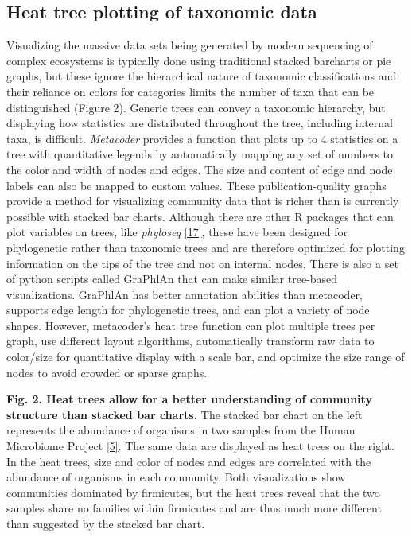 \documentclass[10pt,letterpaper]{article}
\begin{document}
\subsection*{Heat tree plotting of taxonomic
data}\label{heat-tree-plotting-of-taxonomic-data}

Visualizing the massive data sets being generated by modern sequencing
of complex ecosystems is typically done using traditional stacked
barcharts or pie graphs, but these ignore the hierarchical nature of
taxonomic classifications and their reliance on colors for categories
limits the number of taxa that can be distinguished (Figure 2). Generic
trees can convey a taxonomic hierarchy, but displaying how statistics
are distributed throughout the tree, including internal taxa, is
difficult. \emph{Metacoder} provides a function that plots up to 4
statistics on a tree with quantitative legends by automatically mapping
any set of numbers to the color and width of nodes and edges. The size
and content of edge and node labels can also be mapped to custom values.
These publication-quality graphs provide a method for visualizing
community data that is richer than is currently possible with stacked
bar charts. Although there are other R packages that can plot variables
on trees, like \emph{phyloseq} \hyperref[csl:17]{[17]}, these have
been designed for phylogenetic rather than taxonomic trees and are
therefore optimized for plotting information on the tips of the tree and
not on internal nodes. There is also a set of python scripts called
GraPhlAn that can make similar tree-based visualizations. GraPhlAn has
better annotation abilities than metacoder, supports edge length for
phylogenetic trees, and can plot a variety of node shapes. However,
metacoder's heat tree function can plot multiple trees per graph, use
different layout algorithms, automatically transform raw data to
color/size for quantitative display with a scale bar, and optimize the
size range of nodes to avoid crowded or sparse graphs.

\textbf{Fig. 2. Heat trees allow for a better understanding of community
structure than stacked bar charts.} The stacked bar chart on the left
represents the abundance of organisms in two samples from the Human
Microbiome Project \hyperref[csl:5]{[5]}. The same data are
displayed as heat trees on the right. In the heat trees, size and color
of nodes and edges are correlated with the abundance of organisms in
each community. Both visualizations show communities dominated by
firmicutes, but the heat trees reveal that the two samples share no
families within firmicutes and are thus much more different than
suggested by the stacked bar chart.
\end{document}
